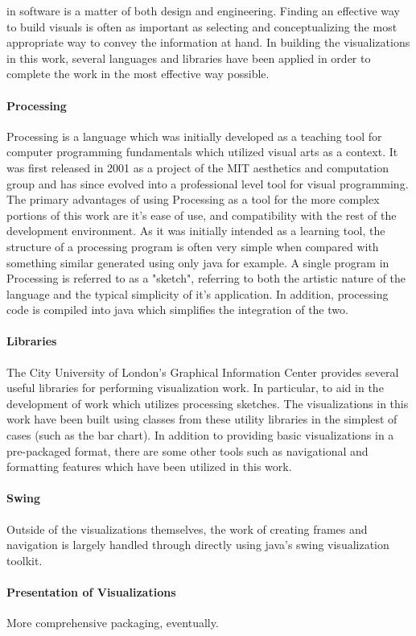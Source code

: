  in software is a matter of both design and engineering. Finding an effective way to build visuals is often as important as selecting and conceptualizing the most appropriate way to convey the information at hand. In building the visualizations in this work, several languages and libraries have been applied in order to complete the work in the most effective way possible.

\paragraph{Processing}
Processing is a language which was initially developed as a teaching tool for computer programming fundamentals which utilized visual arts as a context. It was first released in 2001 as a project of the MIT aesthetics and computation group and has since evolved into a professional level tool for visual programming. The primary advantages of using Processing as a tool for the more complex portions of this work are it's ease of use, and compatibility with the rest of the development environment. As it was initially intended as a learning tool, the structure of a processing program is often very simple when compared with something similar generated using only java for example. A single program in Processing is referred to as a "sketch", referring to both the artistic nature of the language and the typical simplicity of it's application. In addition, processing code is compiled into java which simplifies the integration of the two. 

\paragraph{Libraries}
The City University of London's Graphical Information Center provides several useful libraries for performing visualization work. In particular, to aid in the development of work which utilizes processing sketches. The visualizations in this work have been built using classes from these utility libraries in the simplest of cases (such as the bar chart). In addition to providing basic visualizations in a pre-packaged format, there are some other tools such as navigational and formatting features which have been utilized in this work.  

\paragraph{Swing}
Outside of the visualizations themselves, the work of creating frames and navigation is largely handled through directly using java's swing visualization toolkit.

\paragraph{Presentation of Visualizations}
More comprehensive packaging, eventually.
